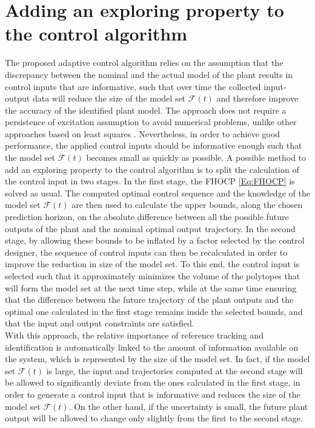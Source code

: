\documentclass[10 pt, letterpaper]{article}
\begin{document}
\section{Adding an exploring property to the control algorithm}\label{S:for_identification}
The proposed adaptive control algorithm relies on the assumption that the discrepancy between the nominal and the actual model of the plant results in control inputs that are informative, such that over time the collected input-output data will reduce the size of the model set $\mathcal{F}(t)$ and therefore improve the accuracy of the identified plant model. The approach does not require a persistence of excitation assumption to avoid numerical problems, unlike other approaches based on least squares \cite{PE_ref2}. Nevertheless, in order to achieve good performance, the applied control inputs should be informative enough such that the model set $\mathcal{F}(t)$ becomes small as quickly as possible. A possible method to add an exploring property to the control algorithm is to split the calculation of the control input in two stages. In the first stage, the FHOCP \eqref{Eq:FHOCP} is solved as usual. The computed optimal control sequence and the knowledge of the model set $\mathcal{F}(t)$ are then used to calculate the upper bounds, along the chosen prediction horizon, on the absolute difference between all the possible future outputs of the plant and the nominal optimal output trajectory. In the second stage, by allowing these bounds to be inflated by a factor selected by the control designer, the sequence of control inputs can then be recalculated in order to improve the reduction in size of the model set. To this end, the control input is selected such that it approximately minimizes the volume of the polytopes that will form the model set at the next time step, while at the same time ensuring that the difference between the future trajectory of the plant outputs and the optimal one calculated in the first stage remains inside the selected bounds, and that the input and output constraints are satisfied.\\
With this approach, the relative importance of reference tracking and identification is automatically linked to the amount of information available on the system, which is represented by the size of the model set. In fact, if the model set $\mathcal{F}(t)$ is large, the input and trajectories computed at the second stage will be allowed to significantly deviate from the ones calculated in the first stage, in order to generate a control input that is informative and reduces the size of the model set $\mathcal{F}(t)$. On the other hand, if the uncertainty is small, the future plant output will be allowed to change only slightly from the first to the second stage.\\
\end{document}
